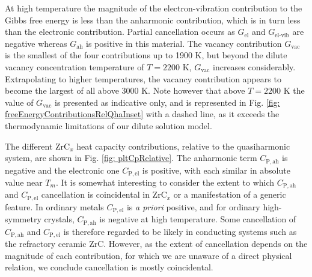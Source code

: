 \documentclass[twocolumn,american,aps,prb,showpacs,showkeys,amsmath,amssymb,superscriptaddress,a4]{revtex4-1}
\begin{document}
At high temperature the magnitude of the electron-vibration contribution to the Gibbs free energy is less than the anharmonic contribution, which is in turn less than the electronic contribution. Partial cancellation occurs as $G_{\text{el}}$ and $G_{\text{el-vib}}$ are negative whereas $G_{\text{ah}}$ is positive in this material. The vacancy contribution $G_{\text{vac}}$ is the smallest of the four contributions up to 1900 K, but beyond the dilute vacancy concentration temperature of $T=2200$ K, $G_{\text{vac}}$ increases considerably. Extrapolating to higher temperatures, the vacancy contribution appears to become the largest of all above $3000$ K. Note however that above $T=2200$ K the value of $G_{\text{vac}}$ is presented as indicative only, and is represented in Fig. \ref{fig: freeEnergyContributionsRelQhaInset} with a dashed line, as it exceeds the thermodynamic limitations of our dilute solution model.

The different  ZrC$_x$ heat capacity contributions, relative to the quasiharmonic system, are shown in Fig. \ref{fig: pltCpRelative}. The anharmonic term $C_{\text{P},\,\text{ah}}$ is negative and the electronic one $C_{\text{P},\,\text{el}}$ is positive, with each similar in absolute value near $T_m$. It is somewhat interesting to consider the extent to which $C_{\text{P},\,\text{ah}}$ and $C_{\text{P},\,\text{el}}$ cancellation is coincidental in ZrC$_x$ or a manifestation of a generic feature. In ordinary metals $C_{\text{P},\,\text{el}}$ is \emph{a priori} positive, and for ordinary high-symmetry crystals, $C_{\text{P},\,\text{ah}}$ is negative at high temperature.\cite{Glensk2015} Some cancellation of $C_{\text{P},\,\text{ah}}$ and $C_{\text{P},\,\text{el}}$ is therefore regarded to be likely in conducting systems such as the refractory ceramic ZrC. However, as the extent of cancellation depends on the magnitude of each contribution, for which we are unaware of a direct physical relation, we conclude cancellation is mostly coincidental.
\end{document}
